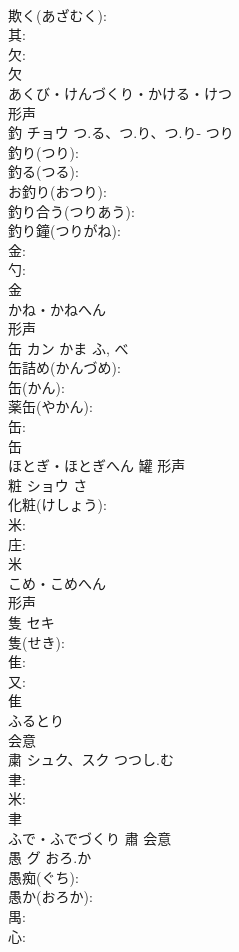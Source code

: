 \documentclass[8pt]{extreport}
\begin{document}
\begin{CJK}{UTF8}{min}
\\	欺く(あざむく): 
\\	其: 
\\	欠: 
\\	欠	
\\	あくび・けんづくり・かける・けつ	
\\	形声 
\\	釣	チョウ	つ.る、つ.り、つ.り-	つり	
\\	釣り(つり): 
\\	釣る(つる): 
\\	お釣り(おつり): 
\\	釣り合う(つりあう): 
\\	釣り鐘(つりがね): 
\\	金: 
\\	勺: 
\\	金	
\\	かね・かねへん	
\\	形声 
\\	缶	カン	かま	ふ, べ	
\\	缶詰め(かんづめ): 
\\	缶(かん): 
\\	薬缶(やかん): 
\\	缶: 
\\	缶	
\\	ほとぎ・ほとぎへん	罐	形声 
\\	粧	ショウ		さ	
\\	化粧(けしょう): 
\\	米: 
\\	庄: 
\\	米	
\\	こめ・こめへん	
\\	形声 
\\	隻	セキ			
\\	隻(せき): 
\\	隹: 
\\	又: 
\\	隹	
\\	ふるとり	
\\	会意 
\\	粛	シュク、スク	つつし.む		
\\	聿: 
\\	米: 
\\	聿	
\\	ふで・ふでづくり	肅	会意 
\\	愚	グ	おろ.か		
\\	愚痴(ぐち): 
\\	愚か(おろか): 
\\	禺: 
\\	心: 

\end{CJK}
\end{document}
